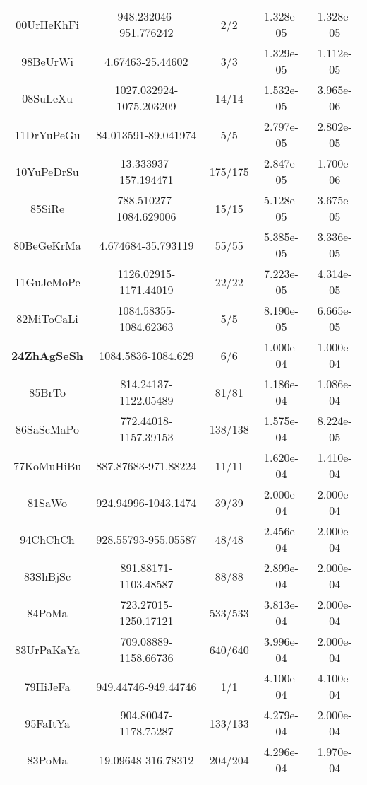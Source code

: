 \begin{longtable}{c c c c c}
    00UrHeKhFi \cite{00UrHeKhFi} & 948.232046-951.776242 & 2/2 & 1.328e-05 & 1.328e-05 \\
    98BeUrWi \cite{98BeUrWi} & 4.67463-25.44602 & 3/3 & 1.329e-05 & 1.112e-05 \\
    08SuLeXu \cite{08SuLeXu} & 1027.032924-1075.203209 & 14/14 & 1.532e-05 & 3.965e-06 \\
    11DrYuPeGu \cite{11DrYuPeGu} & 84.013591-89.041974 & 5/5 & 2.797e-05 & 2.802e-05 \\
    10YuPeDrSu \cite{10YuPeDrSu} & 13.333937-157.194471 & 175/175 & 2.847e-05 & 1.700e-06 \\
    85SiRe \cite{85SiRe} & 788.510277-1084.629006 & 15/15 & 5.128e-05 & 3.675e-05 \\
    80BeGeKrMa \cite{80BeGeKrMa} & 4.674684-35.793119 & 55/55 & 5.385e-05 & 3.336e-05 \\
    11GuJeMoPe \cite{11GuJeMoPe} & 1126.02915-1171.44019 & 22/22 & 7.223e-05 & 4.314e-05 \\
    82MiToCaLi \cite{82MiToCaLi} & 1084.58355-1084.62363 & 5/5 & 8.190e-05 & 6.665e-05 \\
    \textbf{24ZhAgSeSh} \cite{24ZhAgSeSh} & 1084.5836-1084.629 & 6/6 & 1.000e-04 & 1.000e-04 \\
    85BrTo \cite{85BrTo} & 814.24137-1122.05489 & 81/81 & 1.186e-04 & 1.086e-04 \\
    86SaScMaPo \cite{86SaScMaPo} & 772.44018-1157.39153 & 138/138 & 1.575e-04 & 8.224e-05 \\
    77KoMuHiBu \cite{77KoMuHiBu} & 887.87683-971.88224 & 11/11 & 1.620e-04 & 1.410e-04 \\
    81SaWo \cite{81SaWo} & 924.94996-1043.1474 & 39/39 & 2.000e-04 & 2.000e-04 \\
    94ChChCh \cite{94ChChCh} & 928.55793-955.05587 & 48/48 & 2.456e-04 & 2.000e-04 \\
    83ShBjSc \cite{83ShBjSc} & 891.88171-1103.48587 & 88/88 & 2.899e-04 & 2.000e-04 \\
    84PoMa \cite{84PoMa} & 723.27015-1250.17121 & 533/533 & 3.813e-04 & 2.000e-04 \\
    83UrPaKaYa \cite{83UrPaKaYa} & 709.08889-1158.66736 & 640/640 & 3.996e-04 & 2.000e-04 \\
    79HiJeFa \cite{79HiJeFa} & 949.44746-949.44746 & 1/1 & 4.100e-04 & 4.100e-04 \\
    95FaItYa \cite{95FaItYa} & 904.80047-1178.75287 & 133/133 & 4.279e-04 & 2.000e-04 \\
    83PoMa \cite{83PoMa} & 19.09648-316.78312 & 204/204 & 4.296e-04 & 1.970e-04 \\

\end{longtable}
